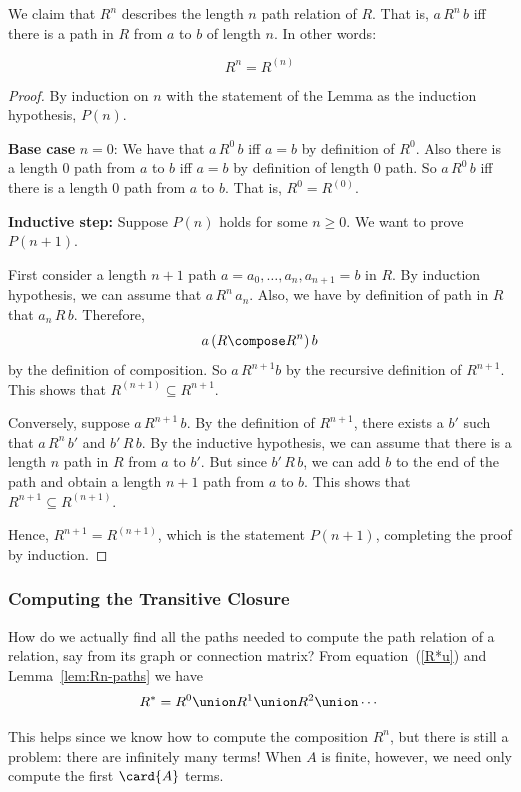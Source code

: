 We claim that $R^n$ describes the length $n$ path relation of $R$.  That
is, $a\, R^n\, b$ iff there is a path in $R$ from $a$ to $b$ of
length $n$.  In other words:
\begin{lemma}\label{lem:Rn-paths}
\[
R^n = R^{(n)}
\]
\end{lemma}

\begin{proof}
By induction on $n$ with the statement of the Lemma as the induction
hypothesis, $P(n)$.

\textbf{Base case} $n=0$: We have that $a\, R^0\, b$ iff $a = b$ by
definition of $R^0$.  Also there is a length 0 path from $a$ to $b$ iff $a
= b$ by definition of length 0 path.  So $a\, R^0\, b$ iff there is a
length 0 path from $a$ to $b$.  That is, $R^0 = R^{(0)}$.

\textbf{Inductive step:} Suppose $P(n)$ holds for some $n\ge 0$.  We want
to prove $P(n+1)$.

First consider a length $n+1$ path $a=a_0,\dots,a_n,a_{n+1}=b$ in $R$.  By
induction hypothesis, we can assume that $a\, R^n\, a_n$.  Also, we have
by definition of path in $R$ that $a_n\, R\, b$.  Therefore,
\[
a\, (R \compose R^n)\, b
\]
by the definition of composition.  So $a\, R^{n+1} b$ by the recursive
definition of $R^{n+1}$.  This shows that $R^{(n+1)} \subseteq R^{n+1}$.

Conversely, suppose $a\, R^{n+1}\, b$.  By the definition of $R^{n+1}$,
there exists a $b'$ such that $a\, R^n\, b'$ and $b'\, R\, b$.  By the
inductive hypothesis, we can assume that there is a length $n$ path in $R$
from $a$ to $b'$.  But since $b'\, R\, b$, we can add $b$ to the end of
the path and obtain a length $n+1$ path from $a$ to $b$.  This shows that
$R^{n+1} \subseteq R^{(n+1)}$.

Hence, $R^{n+1} = R^{(n+1)}$, which is the statement $P(n+1)$, completing
the proof by induction.
\end{proof}

\subsubsection{Computing the Transitive Closure}

How do we actually find all the paths needed to compute the path relation
of a relation, say from its graph or connection matrix?  From
equation~(\ref{R*u}) and Lemma~\ref{lem:Rn-paths} we have
\[
R^* = R^0 \union  R^1 \union R^2 \union \cdots
\]

This helps since we know how to compute the composition $R^n$, but there
is still a problem: there are infinitely many terms!  When $A$ is finite,
however, we need only compute the first $\card{A}$ terms.

